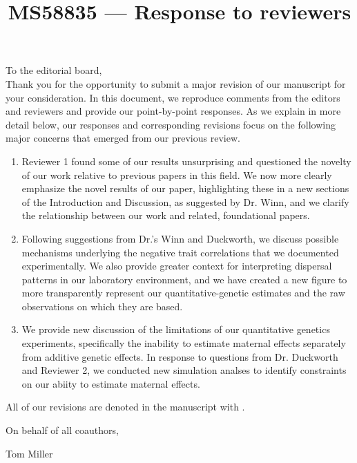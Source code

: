 \documentclass[12pt]{article}
\newcommand{\revise}[1]{{\color{Mahogany}{#1}}}
\begin{document}
\title{MS58835 --- Response to reviewers}

\maketitle
\noindent To the editorial board,\\

Thank you for the opportunity to submit a major revision of our manuscript for your consideration. In this document, we reproduce comments from the editors and reviewers and provide our point-by-point responses. As we explain in more detail below, our responses and corresponding revisions focus on the following major concerns that emerged from our previous review.
\begin{enumerate}
\item{Reviewer 1 found some of our results unsurprising and questioned the novelty of our work relative to previous papers in this field. We now more clearly emphasize the novel results of our paper, highlighting these in a new sections of the Introduction and Discussion, as suggested by Dr. Winn, and we clarify the relationship between our work and related, foundational papers.}
\item{Following suggestions from Dr.'s Winn and Duckworth, we discuss possible mechanisms underlying the negative trait correlations that we documented experimentally. We also provide greater context for interpreting dispersal patterns in our laboratory environment, and we have created a new figure to more transparently represent our quantitative-genetic estimates and the raw observations on which they are based.}
\item{We provide new discussion of the limitations of our quantitative genetics experiments, specifically the inability to estimate maternal effects separately from additive genetic effects. In response to questions from Dr. Duckworth and Reviewer 2, we conducted new simulation analses to identify constraints on our abiity to estimate maternal effects.}
\end{enumerate}

All of our revisions are denoted in the manuscript with \revise{Mahogany font}.

\vspace{2em}
\hfill On behalf of all coauthors,

\hfill Tom Miller
\newpage
\end{document}
